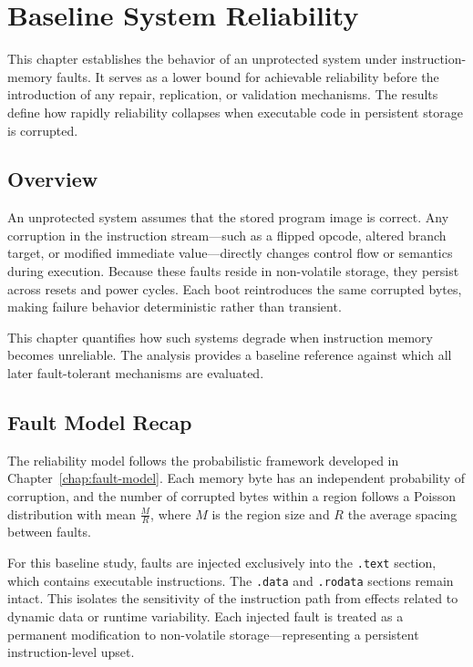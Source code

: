 \chapter{Baseline System Reliability}
\label{chap:baseline-reliability}

This chapter establishes the behavior of an unprotected system under instruction-memory faults. 
It serves as a lower bound for achievable reliability before the introduction of any repair, replication, 
or validation mechanisms. The results define how rapidly reliability collapses when executable code 
in persistent storage is corrupted.

\section{Overview}
\label{sec:baseline-overview}

An unprotected system assumes that the stored program image is correct. 
Any corruption in the instruction stream---such as a flipped opcode, altered branch target, 
or modified immediate value---directly changes control flow or semantics during execution. 
Because these faults reside in non-volatile storage, they persist across resets and power cycles. 
Each boot reintroduces the same corrupted bytes, making failure behavior deterministic rather than transient.

This chapter quantifies how such systems degrade when instruction memory becomes unreliable. 
The analysis provides a baseline reference against which all later fault-tolerant mechanisms are evaluated.

\section{Fault Model Recap}
\label{sec:baseline-fault-model}

The reliability model follows the probabilistic framework developed in Chapter~\ref{chap:fault-model}. 
Each memory byte has an independent probability of corruption, and the number of corrupted bytes 
within a region follows a Poisson distribution with mean $\frac{M}{R}$, 
where $M$ is the region size and $R$ the average spacing between faults.

For this baseline study, faults are injected exclusively into the \texttt{.text} section, 
which contains executable instructions. 
The \texttt{.data} and \texttt{.rodata} sections remain intact. 
This isolates the sensitivity of the instruction path from effects related to dynamic data or runtime variability. 
Each injected fault is treated as a permanent modification to non-volatile storage---representing 
a persistent instruction-level upset.

